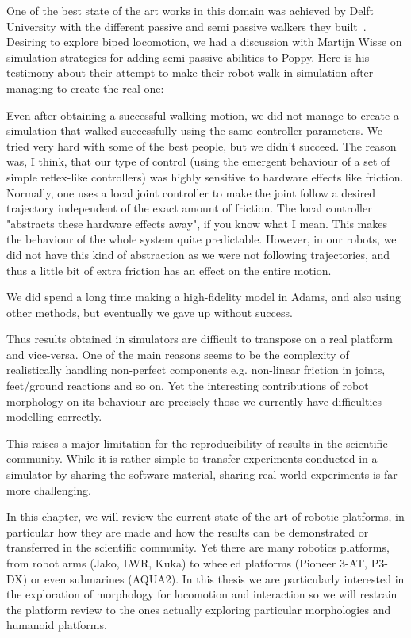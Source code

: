 One of the best state of the art works in this domain was achieved by Delft University with the different passive and semi passive walkers they built~\parencite{wisse2005three}. Desiring to explore biped locomotion, we had a discussion with Martijn Wisse on simulation strategies for adding semi-passive abilities to Poppy. Here is his testimony about their attempt to make their robot walk in simulation after managing to create the real one:

\begin{formal}

Even after obtaining a successful walking motion, we did not manage to create a simulation that walked successfully using the same controller parameters. We tried very hard with some of the best people, but we didn’t succeed. The reason was, I think, that our type of control (using the emergent behaviour of a set of simple reflex-like controllers) was highly sensitive to hardware effects like friction. Normally, one uses a local joint controller to make the joint follow a desired trajectory independent of the exact amount of friction. The local controller "abstracts these hardware effects away", if you know what I mean. This makes the behaviour of the whole system quite predictable. However, in our robots, we did not have this kind of abstraction as we were not following trajectories, and thus a little bit of extra friction has an effect on the entire motion.

We did spend a long time making a high-fidelity model in Adams, and also using other methods, but eventually we gave up without success.

\end{formal}

Thus results obtained in simulators are difficult to transpose on a real platform and vice-versa. One of the main reasons seems to be the complexity of realistically handling non-perfect components e.g. non-linear friction in joints, feet/ground reactions and so on. Yet the interesting contributions of robot morphology on its behaviour are precisely those we currently have difficulties modelling correctly.

This raises a major limitation for the reproducibility of results in the scientific community. While it is rather simple to transfer experiments conducted in a simulator by sharing the software material, sharing real world experiments is far more challenging.

In this chapter, we will review the current state of the art of robotic platforms, in particular how they are made and how the results can be demonstrated or transferred in the scientific community. Yet there are many robotics platforms, from robot arms (Jako, LWR, Kuka) to wheeled platforms (Pioneer 3-AT, P3-DX) or even submarines (AQUA2). In this thesis we are particularly interested in the exploration of morphology for locomotion and interaction so we will restrain the platform review to the ones actually exploring particular morphologies and humanoid platforms.


